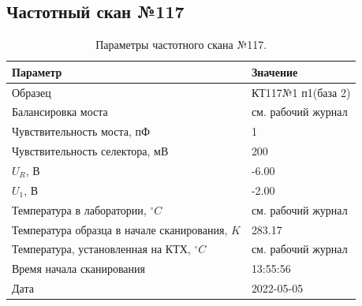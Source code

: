\subsection{Частотный скан №117}
\begin{table}[!ht]
    \centering
    \caption{Параметры частотного скана №117.}
    \begin{tabular}{|l|l|}
        \hline
        Параметр                                       & Значение                  \\ \hline
        Образец                                        & КТ117№1 п1(база 2)        \\ \hline
        Балансировка моста                             & см. рабочий журнал        \\ \hline
        Чувствительность моста, пФ                     & 1                         \\ \hline
        Чувствительность селектора, мВ                 & 200                       \\ \hline
        $U_R$, В                                       & -6.00                     \\ \hline
        $U_1$, В                                       & -2.00                     \\ \hline
        Температура в лаборатории, $^\circ C$          & см. рабочий журнал        \\ \hline
        Температура образца в начале сканирования, $K$ & 283.17                    \\ \hline
        Температура, установленная на КТХ, $^\circ C$  & см. рабочий журнал        \\ \hline
        Время начала сканирования                      & 13:55:56                  \\ \hline
        Дата                                           & 2022-05-05                \\ \hline
    \end{tabular}
    \label{table:frequency_scan_117}
\end{table}

